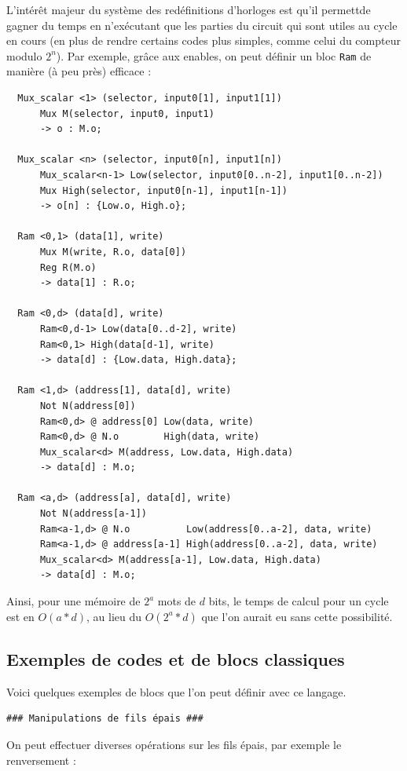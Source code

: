 \documentclass[13pt]{article}
\begin{document}
L'intérêt majeur du système des redéfinitions d'horloges est qu'il permettde
gagner du temps en n'exécutant que les parties du circuit qui sont utiles au
cycle en cours (en plus de rendre certains codes plus simples, comme celui du
compteur modulo $2^n$). Par exemple, grâce aux enables, on peut définir un bloc
\texttt{Ram} de manière (à peu près) efficace :
\begin{verbatim}
  Mux_scalar <1> (selector, input0[1], input1[1])
      Mux M(selector, input0, input1)
      -> o : M.o;

  Mux_scalar <n> (selector, input0[n], input1[n])
      Mux_scalar<n-1> Low(selector, input0[0..n-2], input1[0..n-2])
      Mux High(selector, input0[n-1], input1[n-1])
      -> o[n] : {Low.o, High.o};

  Ram <0,1> (data[1], write)
      Mux M(write, R.o, data[0])
      Reg R(M.o)
      -> data[1] : R.o;

  Ram <0,d> (data[d], write)
      Ram<0,d-1> Low(data[0..d-2], write)
      Ram<0,1> High(data[d-1], write)
      -> data[d] : {Low.data, High.data};

  Ram <1,d> (address[1], data[d], write)
      Not N(address[0])
      Ram<0,d> @ address[0] Low(data, write)
      Ram<0,d> @ N.o        High(data, write)
      Mux_scalar<d> M(address, Low.data, High.data)
      -> data[d] : M.o;

  Ram <a,d> (address[a], data[d], write)
      Not N(address[a-1])
      Ram<a-1,d> @ N.o          Low(address[0..a-2], data, write)
      Ram<a-1,d> @ address[a-1] High(address[0..a-2], data, write)
      Mux_scalar<d> M(address[a-1], Low.data, High.data)
      -> data[d] : M.o;
\end{verbatim}
Ainsi, pour une mémoire de $2^a$ mots de $d$ bits, le temps de calcul pour un
cycle est en $O(a*d)$, au lieu du $O(2^a * d)$ que l'on aurait eu sans cette
possibilité.


\subsection{Exemples de codes et de blocs classiques}
Voici quelques exemples de blocs que l'on peut définir avec ce langage.

\begin{verbatim}
### Manipulations de fils épais ###
\end{verbatim}

On peut effectuer diverses opérations sur les fils épais, par exemple le
renversement :
\end{document}
